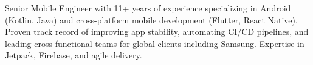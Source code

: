 

\begin{cvparagraph}

Senior Mobile Engineer with 11+ years of experience specializing in Android (Kotlin, Java) and cross-platform mobile development (Flutter, React Native). Proven track record of improving app stability, automating CI/CD pipelines, and leading cross-functional teams for global clients including Samsung. Expertise in Jetpack, Firebase, and agile delivery.
\end{cvparagraph}